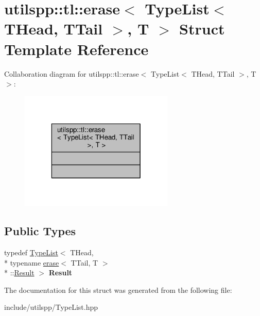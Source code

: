\hypertarget{structutilspp_1_1tl_1_1erase_3_01TypeList_3_01THead_00_01TTail_01_4_00_01T_01_4}{\section{utilspp\-:\-:tl\-:\-:erase$<$ Type\-List$<$ T\-Head, T\-Tail $>$, T $>$ Struct Template Reference}
\label{structutilspp_1_1tl_1_1erase_3_01TypeList_3_01THead_00_01TTail_01_4_00_01T_01_4}
}


Collaboration diagram for utilspp\-:\-:tl\-:\-:erase$<$ Type\-List$<$ T\-Head, T\-Tail $>$, T $>$\-:\nopagebreak
\begin{figure}[H]
\begin{center}
\leavevmode
\includegraphics[width=208pt]{structutilspp_1_1tl_1_1erase_3_01TypeList_3_01THead_00_01TTail_01_4_00_01T_01_4__coll__graph}
\end{center}
\end{figure}
\subsection*{Public Types}
\begin{DoxyCompactItemize}
\item 
\hypertarget{structutilspp_1_1tl_1_1erase_3_01TypeList_3_01THead_00_01TTail_01_4_00_01T_01_4_a63196047031f70470bbb9419704f8563}{typedef \hyperlink{structutilspp_1_1tl_1_1TypeList}{Type\-List}$<$ T\-Head, \\*
typename \hyperlink{structutilspp_1_1tl_1_1erase}{erase}$<$ T\-Tail, T $>$\\*
\-::\hyperlink{structutilspp_1_1tl_1_1TypeList}{Result} $>$ {\bfseries Result}}\label{structutilspp_1_1tl_1_1erase_3_01TypeList_3_01THead_00_01TTail_01_4_00_01T_01_4_a63196047031f70470bbb9419704f8563}

\end{DoxyCompactItemize}


The documentation for this struct was generated from the following file\-:\begin{DoxyCompactItemize}
\item 
include/utilspp/Type\-List.\-hpp\end{DoxyCompactItemize}

